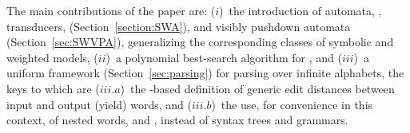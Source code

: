 The main contributions 
of the paper are:
($i$)~the introduction of automata, \SWA, transducers, \SWT (Section~\ref{section:SWA}),
and visibly pushdown automata \SWVPA (Section~\ref{sec:SWVPA}),
generalizing the corresponding classes of symbolic and weighted models,
($ii$)~a polynomial best-search algorithm for \SWVPA, %
and ($iii$)~a uniform framework (Section~\ref{sec:parsing}) for parsing over infinite alphabets,
the keys to which are
($iii.a$)~the \SWT-based definition of generic edit distances between input and output (yield) words,
and ($iii.b$)~the use, for convenience in this context,
of nested words, and \SWVPA,
instead of syntax trees and grammars. %


